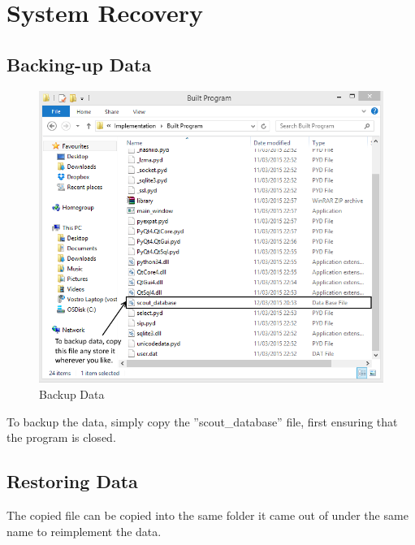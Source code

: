 \section{System Recovery}

\subsection{Backing-up Data}

\begin{figure}[H]
\includegraphics[width=\textwidth]{./Manual/Images/BackupData.png}
    \caption{Backup Data} \label{fig:backup_data}
\end{figure}


To backup the data, simply copy the ''scout\_database'' file, first ensuring that the program is closed.

\subsection{Restoring Data}
The copied file can be copied into the same folder it came out of under the same name to reimplement the data.

\stopcontents[manual]